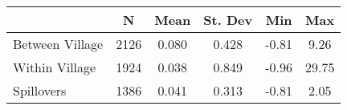 \begin{tabular}{l*{5}{c}}\hline&\multicolumn{1}{c}{N}&\multicolumn{1}{c}{Mean}&\multicolumn{1}{c}{St. Dev}&\multicolumn{1}{c}{Min}&\multicolumn{1}{c}{Max}\\ \hline 
Between Village & 2126 & 0.080 & 0.428 & -0.81 & 9.26 \\
Within Village & 1924 & 0.038 & 0.849 & -0.96 & 29.75 \\
Spillovers & 1386 & 0.041 & 0.313 & -0.81 & 2.05 \\
\hline \end{tabular}

